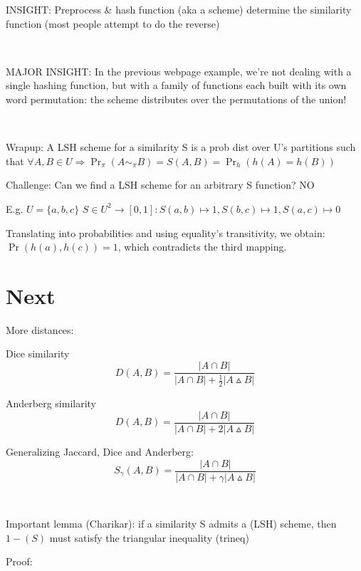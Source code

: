 \documentclass{report}
\begin{document}
	INSIGHT: Preprocess \& hash function (aka a scheme) determine the similarity function (most people attempt to do the reverse)
	
	\
	
	MAJOR INSIGHT: In the previous webpage example, we're not dealing with a single hashing function, but with a family of functions each built with its own word permutation: the scheme distributes over the permutations of the union!
	
	\
	
	Wrapup: A LSH scheme for a similarity S is a prob dist over U's partitions such that $\forall A, B \in  U \Rightarrow \Pr_\pi(A\sim_\pi B) = S(A, B) = \Pr_h(h(A)=h(B))$
	
	Challenge: Can we find a LSH scheme for an arbitrary S function? NO
	
	E.g. $U = \{a, b, c\}$
	$S \in U^2 \rightarrow [0, 1] : S(a, b) \mapsto 1, S(b, c) \mapsto 1, S(a, c) \mapsto 0$ %
	
	Translating into probabilities and using equality's transitivity, we obtain: $\Pr(h(a), h(c))=1$, which contradicts the third mapping.
	
	 
	
	
	\chapter{Next}
	
	More distances:
	
	Dice similarity
	\begin{equation}
	\displaystyle D(A, B) = \frac{|A\cap B|}{|A\cap B| + \frac{1}{2}|A\vartriangle B|}
	\end{equation}
	
	Anderberg similarity
	\begin{equation}
	\displaystyle D(A, B) = \frac{|A\cap B|}{|A\cap B| + 2|A\vartriangle B|}
	\end{equation}
	
	Generalizing Jaccard, Dice and Anderberg: 
	\begin{equation}
	\displaystyle S_\gamma(A, B) = \frac{|A\cap B|}{|A\cap B| + \gamma|A\vartriangle B|}
	\end{equation}
	
	\
	
	Important lemma (Charikar): if a similarity S admits a (LSH) scheme, then $1-(S)$ must satisfy the triangular inequality (trineq)
	
	Proof: %
	
\end{document}
